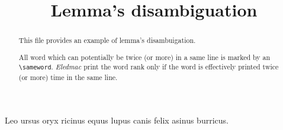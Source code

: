 \documentclass{article}
\begin{document}
\begin{english}
\date{}
\title{Lemma's disambiguation}
\maketitle


\begin{abstract}
This file provides an example of lemma's disambuigation. 

All word which can potentially be twice (or more) in a same line is marked by an \verb+\sameword+. \emph{Eledmac} print the word rank only if the word is effectively printed twice (or more) time in the same line. 
\end{abstract}
\end{english}





\beginnumbering
\pstart
Leo  ursus  oryx  ricinus  equus 
lupus  canis  felix  asinus  burricus.

\pend
\endnumbering
\end{document}
